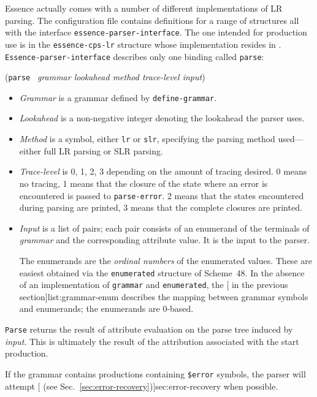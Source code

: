 \documentclass{article}
\renewcommand{\var}[1]{\noindent\mbox{\textit{#1}}}
\newcommand{\ide}[1]{{\frenchspacing\textnormal{\texttt{#1}}}}
\newcommand{\pproto}[2]{\unskip%
\mbox{\texonly{\spaceskip=0.5em}#1}%
\mbox{ }\texonly{\nobreak}\htmlonly{ }\textrm{#2}}
\newcommand{\proto}[3]{\par\bigskip\begin{flushleft}\pproto{(\texttt{#1}}{\textit{#2})}\hspace*{\fill}{#3}\end{flushleft}}
\newcommand{\codefont}[1]{\texttt{#1}}
\begin{document}
Essence actually comes with a number of different implementations of
LR parsing.  The  configuration file contains
definitions for a range of structures all with the interface
\codefont{essence-parser-interface}.  The one intended for production use is in the
\codefont{essence-cps-lr} structure whose implementation resides in
.  \codefont{Essence-parser-interface} describes only 
one binding called \codefont{parse}:

\label{proc:parse}
\proto{parse}{grammar lookahead method trace-level input}{procedure}
%
\begin{itemize}
\item \var{Grammar} is a grammar defined by \codefont{define-grammar}.
\item \var{Lookahead} is a non-negative integer denoting the
  lookahead the parser uses.
\item \var{Method} is a symbol, either \codefont{lr} or
  \codefont{slr}, specifying the parsing method used---either full LR
  parsing or SLR parsing.
\item \var{Trace-level} is 0, 1, 2, 3 depending on the amount of
  tracing desired.  0 means no tracing, 1 means that the closure of
  the state where an error is encountered is passed to
  \ide{parse-error}.  2 means that the states encountered during
  parsing are printed, 3 means that the complete closures are printed.
\item \var{Input} is a list of pairs; each pair consists of an enumerand of the
  terminals of \var{grammar} and the corresponding attribute value.  It is the
  input to the parser. 
  
  The enumerands are the \emph{ordinal numbers} of the enumerated
  values.  These are easiest obtained via the \codefont{enumerated} structure
  of Scheme~48.  In the absence of an implementation of \codefont{grammar} and
  \codefont{enumerated}, the [ in the previous
  section]{list:grammar-enum} describes the mapping between grammar symbols and
  enumerands; the enumerands are 0-based.
\end{itemize}
%
\ide{Parse} returns the result of attribute evaluation on the parse
tree induced by \var{input}.  This is ultimately the result of the
attribution associated with the start production.

If the grammar contains productions containing \codefont{\$error}
symbols, the parser will attempt [ (see
Sec.~\ref{sec:error-recovery})]{sec:error-recovery} when possible.
\end{document}
